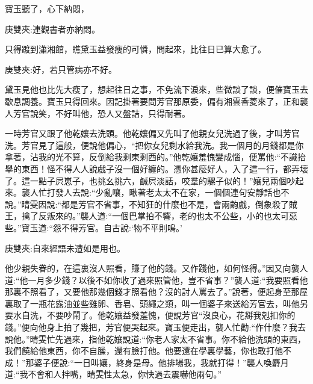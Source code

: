 \begin{parag}
    寶玉聽了，心下納悶，\begin{note}庚雙夾:連觀書者亦納悶。\end{note}只得踱到瀟湘館，瞧黛玉益發瘦的可憐，問起來，比往日已算大愈了。\begin{note}庚雙夾:好，若只管病亦不好。\end{note}黛玉見他也比先大瘦了，想起往日之事，不免流下淚來，些微談了談，便催寶玉去歇息調養。寶玉只得回來。因記掛著要問芳官那原委，偏有湘雲香菱來了，正和襲人芳官說笑，不好叫他，恐人又盤詰，只得耐著。
\end{parag}


\begin{parag}
    一時芳官又跟了他乾孃去洗頭。他乾孃偏又先叫了他親女兒洗過了後，才叫芳官洗。芳官見了這般，便說他偏心，“把你女兒剩水給我洗。我一個月的月錢都是你拿著，沾我的光不算，反倒給我剩東剩西的。”他乾孃羞愧變成惱，便罵他:“不識抬舉的東西！怪不得人人說戲子沒一個好纏的。憑你甚麼好人，入了這一行，都弄壞了。這一點子屄崽子，也挑幺挑六，鹹屄淡話，咬羣的騾子似的！”孃兒兩個吵起來。襲人忙打發人去說:“少亂嚷，瞅著老太太不在家，一個個連句安靜話也不說。”晴雯因說:“都是芳官不省事，不知狂的什麼也不是，會兩齣戲，倒象殺了賊王，擒了反叛來的。”襲人道:“一個巴掌拍不響，老的也太不公些，小的也太可惡些。”寶玉道:“怨不得芳官。自古說:‘物不平則鳴。’\begin{note}庚雙夾:自來經語未遭如是用也。\end{note}他少親失眷的，在這裏沒人照看，賺了他的錢。又作踐他，如何怪得。”因又向襲人道:“他一月多少錢？以後不如你收了過來照管他，豈不省事？”襲人道:“我要照看他那裏不照看了，又要他那幾個錢才照看他？沒的討人罵去了。”說著，便起身至那屋裏取了一瓶花露油並些雞卵、香皂、頭繩之類，叫一個婆子來送給芳官去，叫他另要水自洗，不要吵鬧了。他乾孃益發羞愧，便說芳官“沒良心，花掰我剋扣你的錢。”便向他身上拍了幾把，芳官便哭起來。寶玉便走出，襲人忙勸:“作什麼？我去說他。”晴雯忙先過來，指他乾孃說道:“你老人家太不省事。你不給他洗頭的東西，我們饒給他東西，你不自臊，還有臉打他。他要還在學裏學藝，你也敢打他不成！”那婆子便說:“一日叫孃，終身是母。他排場我，我就打得！”襲人喚麝月道:“我不會和人拌嘴，晴雯性太急，你快過去震嚇他兩句。” 
\end{parag}
